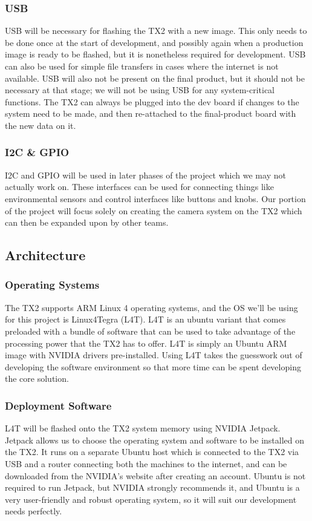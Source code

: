 \documentclass[letterpaper,10pt,serif,draftclsnofoot,onecolumn,compsoc,titlepage]{IEEEtran}
\begin{document}
\subsubsection{USB}
USB will be necessary for flashing the TX2 with a new image. This only needs to be done once at the start of development, and possibly again when a production image is ready to be flashed, but it is nonetheless required for development. USB can also be used for simple file transfers in cases where the internet is not available. USB will also not be present on the final product, but it should not be necessary at that stage; we will not be using USB for any system-critical functions. The TX2 can always be plugged into the dev board if changes to the system need to be made, and then re-attached to the final-product board with the new data on it.

\subsubsection{I2C \& GPIO}
I2C and GPIO will be used in later phases of the project which we may not actually work on. These interfaces can be used for connecting things like environmental sensors and control interfaces like buttons and knobs. Our portion of the project will focus solely on creating the camera system on the TX2 which can then be expanded upon by other teams.

\subsection{Architecture}
\subsubsection{Operating Systems}
The TX2 supports ARM Linux 4 operating systems, and the OS we’ll be using for this project is Linux4Tegra (L4T). L4T is an ubuntu variant that comes preloaded with a bundle of software that can be used to take advantage of the processing power that the TX2 has to offer. L4T is simply an Ubuntu ARM image with NVIDIA drivers pre-installed. Using L4T takes the guesswork out of developing the software environment so that more time can be spent developing the core solution.

\subsubsection{Deployment Software}
L4T will be flashed onto the TX2 system memory using NVIDIA Jetpack. Jetpack allows us to choose the operating system and software to be installed on the TX2. It runs on a separate Ubuntu host which is connected to the TX2 via USB and a router connecting both the machines to the internet, and can be downloaded from the NVIDIA’s website after creating an account. Ubuntu is not required to run Jetpack, but NVIDIA strongly recommends it, and Ubuntu is a very user-friendly and robust operating system, so it will suit our development needs perfectly.
\end{document}
